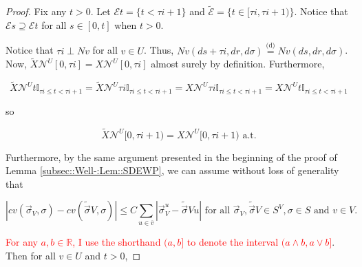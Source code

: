 \documentclass[12pt]{article}
\newcommand{\mb}{\mathbb}
\newcommand{\mc}{\mathcal}
\newcommand{\ov}{\overline}
\newcommand{\te}{\text}
\newcommand{\tr}{\textcolor{red}}
\newcommand{\ind}{\hspace{24pt}}
\newcommand{\deq}{\overset{\text{(d)}}{=}}			%
\renewcommand{\v}{v}							%
\newcommand{\vv}{u}								%
\renewcommand{\U}{U}							%
\renewcommand{\S}{S}							%
\newcommand{\s}{\sigma}							%
\newcommand{\sv}{\vec{\s}}						%
\renewcommand{\t}{t}							%
\renewcommand{\tt}{s}							%
\newcommand{\X}{X}								%
\newcommand{\IGr}{c}							%
\newcommand{\neigh}{\mc{N}}						%
\newcommand{\vind}[1]{^{#1}}					%
\newcommand{\carp}[1]{^{#1}}					%
\newcommand{\vsi}[1]{^{#1}}						%
\newcommand{\cind}[1]{_{#1}}					%
\newcommand{\cl}{\ov}							%
\newcommand{\const}{C}							%
\newcommand{\poiss}{N}							%
\newcommand{\alt}[1]{\widetilde{#1}}			%
\newcommand{\rt}{\tau}							%
\newcommand{\evnt}{\mc{E}}						%
\begin{document}
\begin{proof}
\ind Fix any \(\t > 0\). Let \(\evnt{\t} = \{\t < \rt{i+1}\}\) and \(\alt{\evnt}{	} = \{\t\in [\rt{i},\rt{i+1})\}\). Notice that \(\evnt{\tt} \supseteq \evnt{\t}\) for all \(\tt\in [0,\t]\) when \(\t > 0\). 

\ind Notice that \(\rt{i} \perp \poiss{\v}\) for all \(\v \in \U\). Thus, \(\poiss{\v}(d\tt+\rt{i},dr,d\s) \deq \poiss{\v}(d\tt,dr,d\s)\). Now, \(\alt{\X}{\neigh\vind{\U}}{}[0,\rt{i}] = \X{\neigh\vind{\U}}{[0,\rt{i}]}\) almost surely by definition. Furthermore,

\[\alt{\X}{\neigh\vind{\U}}{\t}\mb{I}_{\rt{i}\leq \t < \rt{i+1}} = \alt{\X}{\neigh\vind{\U}}{\rt{i}}\mb{I}_{\rt{i}\leq \t < \rt{i+1}} = \X{\neigh\vind{\U}}{\rt{i}}\mb{I}_{\rt{i}\leq \t < \rt{i+1}} = \X{\neigh\vind{\U}}{\t}\mb{I}_{\rt{i}\leq \t < \rt{i+1}}\]

so

\[\alt{\X}{\neigh\vind{\U}}{}[0,\rt{i+1}) = \X{\neigh\vind{\U}}{[0,\rt{i+1})} \te{ a.t.}\]

Furthermore, by the same argument presented in the beginning of the proof of Lemma \ref{subsec::Well-:Lem::SDEWP}, we can assume without loss of generality that 

\[|\IGr{\v}(\sv\cind{V}\vsi{},\s) - \IGr{\v}(\alt{\sv}{V}{},\s)| \leq \const{}\sum_{\vv\in \cl{\v}} |\sv\cind{V}\vsi{\vv} - \alt{\sv}{V}{\vv}|\te{ for all } \sv\cind{V}\vsi{},\alt{\sv}{V}{}\in \S\carp{V},\s \in \S \te{ and } \v \in V.\]

\tr{For any \(a,b\in \mb{R}\), I use the shorthand \((a,b]\) to denote the interval \((a\wedge b,a\vee b]\)}. Then for all \(v\in \U\) and \(\t > 0\),


\end{proof}
\end{document}

